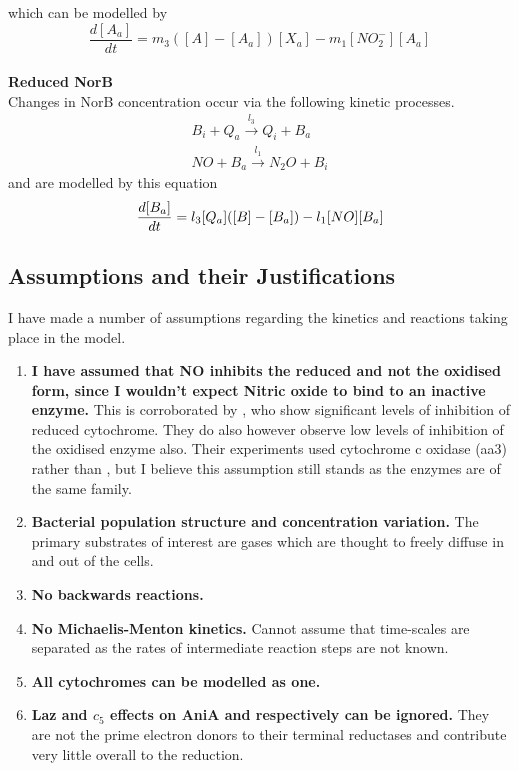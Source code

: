 which can be modelled by
\begin{equation}
\frac{d[A_a]}{dt} = m_3([A] - [A_a])[X_a]- m_{1}[NO_2^-][A_a]
\label{eq:active_ania}
\end{equation}
\\{\bf Reduced NorB}\\
Changes in NorB concentration occur via the following kinetic processes.
\begin{equation*}
\begin{gathered}
B_i + Q_a \xrightarrow{l_3} Q_i + B_a \\
NO + B_a \xrightarrow{l_1} N_{2}O + B_i
\end{gathered}
\end{equation*}
and are modelled by this equation
\begin{equation}
\frac{d[B_a]}{dt} = l_3[Q_a]([B] - [B_a]) - l_1[NO][B_a]\\
\label{eq:active_norb}
\end{equation}


\subsection{Assumptions and their Justifications}
I have made a number of assumptions regarding the kinetics and reactions taking place in the model.
\begin{enumerate}
 \item {\bf I have assumed that NO inhibits the reduced \cbbthree{} and not the oxidised form, since I wouldn't expect Nitric oxide to bind to an inactive enzyme.} This is corroborated by \citet{Giuffre2000}, who show significant levels of inhibition of reduced cytochrome. They do also however observe low levels of inhibition of the oxidised enzyme also. Their experiments used cytochrome c oxidase (aa3) rather than \cbbthree{}, but I believe this assumption still stands as the enzymes are of the same family.
 \item {\bf Bacterial population structure and concentration variation.} The primary substrates of interest are gases which are thought to freely diffuse in and out of the cells.
 \item {\bf No backwards reactions.}
 \item {\bf No Michaelis-Menton kinetics.} Cannot assume that time-scales are separated as the rates of intermediate reaction steps are not known.
 \item {\bf All cytochromes can be modelled as one.}
 \item {\bf Laz and $c_5$ effects on AniA and \cbbthree{} respectively can be ignored.} They are not the prime electron donors to their terminal reductases and contribute very little overall to the reduction\cite{Deeudom2007}.
\end{enumerate}

